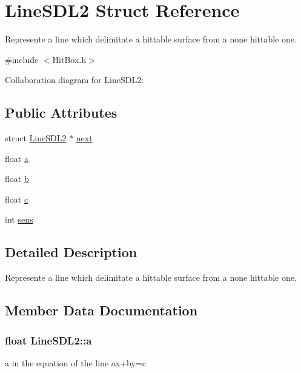 \hypertarget{structLineSDL2}{}\section{Line\+S\+D\+L2 Struct Reference}
\label{structLineSDL2}


Represente a line which delimitate a hittable surface from a none hittable one.  




{\ttfamily \#include $<$Hit\+Box.\+h$>$}



Collaboration diagram for Line\+S\+D\+L2\+:
\subsection*{Public Attributes}
\begin{DoxyCompactItemize}
\item 
struct \hyperlink{structLineSDL2}{Line\+S\+D\+L2} $\ast$ \hyperlink{structLineSDL2_a97e5c096a263e55935fda7808dd62fc3}{next}
\item 
float \hyperlink{structLineSDL2_acc7ec7d970be00e39766e7bbaf4e6375}{a}
\item 
float \hyperlink{structLineSDL2_ac5d6441cec617729d6a89ecaa81e84f8}{b}
\item 
float \hyperlink{structLineSDL2_afe58519a94706033c6dd8bd68c5f66a8}{c}
\item 
int \hyperlink{structLineSDL2_af3899a41b666d9aa2281ae1bc833d5e7}{sens}
\end{DoxyCompactItemize}


\subsection{Detailed Description}
Represente a line which delimitate a hittable surface from a none hittable one. 

\subsection{Member Data Documentation}
\subsubsection[{\texorpdfstring{a}{a}}]{\setlength{\rightskip}{0pt plus 5cm}float Line\+S\+D\+L2\+::a}\hypertarget{structLineSDL2_acc7ec7d970be00e39766e7bbaf4e6375}{}\label{structLineSDL2_acc7ec7d970be00e39766e7bbaf4e6375}
a in the equation of the line ax+by=c 
